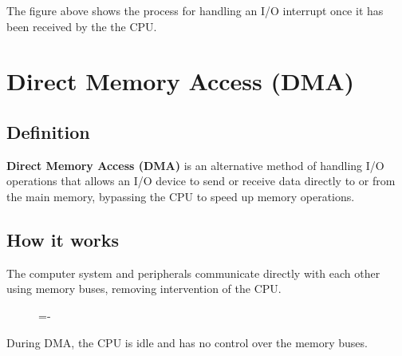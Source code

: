 \documentclass[a4paper]{systems-software}
\begin{document}
The figure above shows the process for handling an I/O interrupt once it has been received by the the CPU.


\section*{Direct Memory Access (DMA)}

\subsection*{Definition}

\textbf{Direct Memory Access (DMA)} is an alternative method of handling I/O operations that allows an I/O device to send or receive data directly to or from the main memory, bypassing the CPU to speed up memory operations.


\subsection*{How it works}

The computer system and peripherals communicate directly with each other using memory buses, removing intervention of the CPU.

\begin{figure}[H]
  \lineskip=-\fboxrule
\end{figure}

During DMA, the CPU is idle and has no control over the memory buses.
\end{document}
